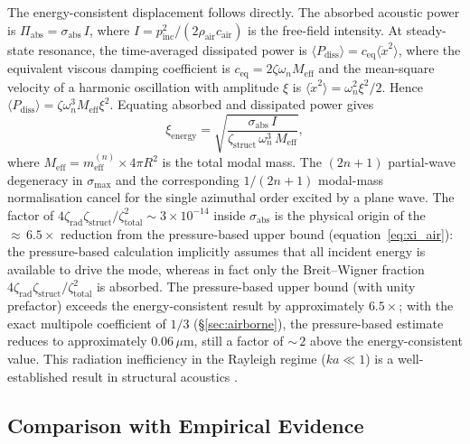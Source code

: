 The energy-consistent displacement follows directly.  The absorbed acoustic
power is $\Pi_\mathrm{abs} = \sigma_\mathrm{abs} \, I$, where
$I = p_\mathrm{inc}^2 / (2 \rho_\mathrm{air} c_\mathrm{air})$ is the
free-field intensity.  At steady-state resonance, the time-averaged
dissipated power is
$\langle P_\mathrm{diss}\rangle = c_\mathrm{eq}\langle\dot{x}^2\rangle$,
where the equivalent viscous damping coefficient is
$c_\mathrm{eq} = 2\zeta\omega_n M_\mathrm{eff}$ and the mean-square
velocity of a harmonic oscillation with amplitude $\xi$ is
$\langle\dot{x}^2\rangle = \omega_n^2\xi^2/2$.  Hence
$\langle P_\mathrm{diss}\rangle = \zeta\omega_n^3 M_\mathrm{eff}\xi^2$.
Equating absorbed and dissipated power gives
\begin{equation}\label{eq:xi_energy}
  \xi_\mathrm{energy}
  = \sqrt{\frac{\sigma_\mathrm{abs}\,I}
               {\zeta_\mathrm{struct}\,\omega_n^3\,M_\mathrm{eff}}},
\end{equation}
where $M_\mathrm{eff} = m_\mathrm{eff}^{(n)} \times 4\pi R^2$ is the total
modal mass.  The $(2n+1)$ partial-wave degeneracy in $\sigma_\mathrm{max}$
and the corresponding $1/(2n+1)$ modal-mass normalisation cancel for the
single azimuthal order excited by a plane wave.
The factor of
$4\zeta_\mathrm{rad}\zeta_\mathrm{struct}/\zeta_\mathrm{total}^2
\sim 3 \times 10^{-14}$ inside $\sigma_\mathrm{abs}$ is the physical origin of the
${\approx}\,6.5\times$ reduction from the pressure-based upper bound
(equation~\ref{eq:xi_air}): the pressure-based calculation implicitly
assumes that all incident energy is available to drive the mode, whereas in
fact only the Breit--Wigner fraction
$4\zeta_\mathrm{rad}\zeta_\mathrm{struct}/\zeta_\mathrm{total}^2$ is absorbed.
The pressure-based upper bound (with unity prefactor) exceeds the
energy-consistent result by approximately $6.5\times$; with the exact
multipole coefficient of $1/3$ (\S\ref{sec:airborne}), the pressure-based
estimate reduces to approximately $0.06\,\mu\text{m}$, still a factor of
${\sim}\,2$ above the energy-consistent value.
This radiation inefficiency in the Rayleigh regime ($ka \ll 1$) is a
well-established result in structural acoustics \cite{Junger1986,FahyGardonio2007}.

\subsection{Comparison with Empirical Evidence}

